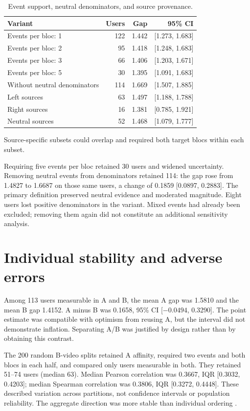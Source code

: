 \documentclass[11pt,a4paper]{article}
\begin{document}
\begin{table}[H]\centering\small
\caption{Event support, neutral denominators, and source provenance.}
\label{tab:supp_support}
\setlength{\tabcolsep}{4pt}
\begin{tabular}{lrrr}\toprule
Variant & Users & Gap & 95\% CI\\\midrule
Events per bloc: 1 & 122 & 1.442 & [1.273, 1.683]\\
Events per bloc: 2 & 95 & 1.418 & [1.248, 1.683]\\
Events per bloc: 3 & 66 & 1.406 & [1.203, 1.671]\\
Events per bloc: 5 & 30 & 1.395 & [1.091, 1.683]\\
Without neutral denominators & 114 & 1.669 & [1.507, 1.885]\\
Left sources & 63 & 1.497 & [1.188, 1.788]\\
Right sources & 16 & 1.381 & [0.785, 1.921]\\
Neutral sources & 52 & 1.468 & [1.079, 1.777]\\
\bottomrule\end{tabular}
\par\smallskip\footnotesize Source-specific subsets could overlap and required both target blocs within each subset.
\end{table}

Requiring five events per bloc retained 30 users and widened uncertainty. Removing neutral events from denominators retained 114: the gap rose from 1.4827 to 1.6687 on those same users, a change of 0.1859 [0.0897, 0.2883]. The primary definition preserved neutral evidence and moderated magnitude. Eight users lost positive denominators in the variant. Mixed events had already been excluded; removing them again did not constitute an additional sensitivity analysis.

\section{Individual stability and adverse errors}
Among 113 users measurable in A and B, the mean A gap was 1.5810 and the mean B gap 1.4152. A minus B was 0.1658, 95\% CI [$-0.0494$, 0.3290]. The point estimate was compatible with optimism from reusing A, but the interval did not demonstrate inflation. Separating A/B was justified by design rather than by obtaining this contrast.

The 200 random B-video splits retained A affinity, required two events and both blocs in each half, and compared only users measurable in both. They retained 51--74 users (median 63). Median Pearson correlation was 0.3667, IQR [0.3032, 0.4203]; median Spearman correlation was 0.3806, IQR [0.3272, 0.4448]. These described variation across partitions, not confidence intervals or population reliability. The aggregate direction was more stable than individual ordering \cite{Pronk2022SplitHalf}.
\end{document}

